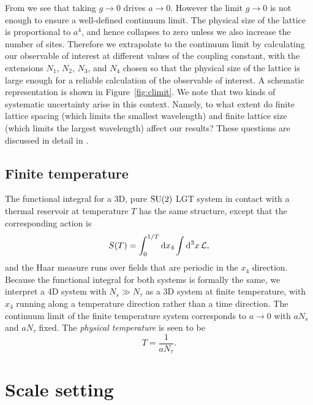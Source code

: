 From  we see that taking $g\to0$ drives $a\to0$.
However the limit $g\to0$ is not enough to ensure a well-defined continuum
limit. The physical size of the lattice is proportional to $a^4$, and hence
collapses to zero unless we also increase the number of sites. Therefore
we extrapolate to the continuum limit by calculating our observable
of interest at different values of the coupling constant, with the 
extensions $N_1$, $N_2$, $N_3$, and $N_4$ chosen so that the physical 
size of the lattice is large enough for a reliable calculation of 
the observable of interest. A schematic representation is shown in
Figure~\ref{fig:climit}. We note that two kinds of systematic uncertainty 
arise in this context. Namely, to what extent do finite lattice
spacing (which limits the smallest wavelength) and finite lattice
size (which limits the largest wavelength) affect our results?
These questions are discussed in detail in 
.

\subsection{Finite temperature}\label{sec:finitetemp}

The functional integral for a 3D, 
pure $\operatorname{SU}(2)$ LGT system in contact with a thermal reservoir at 
temperature $T$ has the same structure, except that the corresponding 
action is
\begin{equation}\label{eq:Tintegral}
  S(T)=\int_0^{1/T}\dd{x_4}\int\dd[3]{x}\mathcal{L},
\end{equation}
and the Haar measure runs over fields that are periodic in the
$x_4$ direction. Because the functional integral for both systems is
formally the same, we interpret a 4D system with $N_s\gg N_\tau$ as
a 3D system at finite temperature, with $x_4$ running along a 
temperature direction rather than a time direction. 
The continuum limit of the finite temperature system corresponds
to $a\to0$ with $aN_s$ and $aN_\tau$ fixed. The {\it physical
temperature} is seen to be
\begin{equation}
  T=\frac{1}{aN_\tau}.
\end{equation}


\section{Scale setting}\label{sec:refscales}


